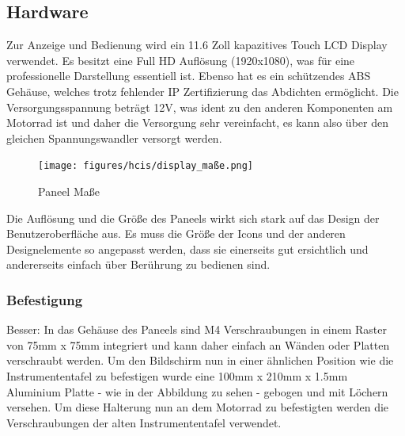 \subsection{Hardware}

Zur Anzeige und Bedienung wird ein 11.6 Zoll kapazitives Touch LCD Display verwendet. Es besitzt eine Full HD Auflösung (1920x1080), was für eine professionelle Darstellung essentiell ist. Ebenso hat es ein schützendes ABS Gehäuse, welches trotz fehlender IP Zertifizierung das Abdichten ermöglicht. Die Versorgungsspannung beträgt 12V, was ident zu den anderen Komponenten am Motorrad ist und daher die Versorgung sehr vereinfacht, es kann also über den gleichen Spannungswandler versorgt werden.

\begin{figure}[H]
	\begin{center}
		\texttt{[image: figures/hcis/display\_maße.png]}
		\caption{Paneel Maße}
		\label{fig:panel}
	\end{center}
\end{figure}

Die Auflösung und die Größe des Paneels wirkt sich stark auf das Design der Benutzeroberfläche aus. Es muss die Größe der Icons und der anderen Designelemente so angepasst werden, dass sie einerseits gut ersichtlich und andererseits einfach über Berührung zu bedienen sind.\\

\newpage

\subsubsection{Befestigung}
Besser: In das Gehäuse des Paneels sind M4 Verschraubungen in einem Raster von 75mm x 75mm integriert und kann daher einfach an Wänden oder Platten verschraubt werden. Um den Bildschirm nun in einer ähnlichen Position wie die Instrumententafel zu befestigen wurde eine 100mm x 210mm x 1.5mm Aluminium Platte - wie in der Abbildung zu sehen - gebogen und mit Löchern versehen. Um diese Halterung nun an dem Motorrad zu befestigten werden die Verschraubungen der alten Instrumententafel verwendet.

